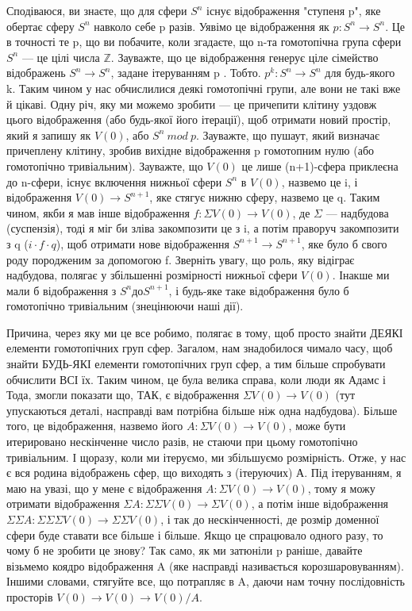 Сподіваюся, ви знаєте, що для сфери $S^n$ існує відображення "ступеня p",
яке обертає сферу $S^n$ навколо себе p разів. Уявімо це відображення як
$p: S^n \rightarrow S^n$. Це в точності те p, що ви побачите, коли згадаєте,
що n-та гомотопічна група сфери $S^n$ --- це цілі числа $\mathbb{Z}$.
Зауважте, що це відображення генерує ціле сімейство відображень $S^n \rightarrow S^n$,
задане ітеруванням p . Тобто. $p^k: S^n \rightarrow S^n$ для будь-якого k.
Таким чином у нас обчислилися деякі гомотопічні групи, але вони не такі вже й цікаві.
Одну річ, яку ми можемо зробити --- це причепити клітину уздовж цього
відображення (або будь-якої його ітерації), щоб отримати новий простір,
який я запишу як $V(0)$, або $S^n\ mod\ p$. Зауважте, що пушаут, який визначає
причеплену клітину, зробив вихідне відображення p гомотопним нулю (або гомотопічно
тривіальним). Зауважте, що $V(0)$ це лише (n+1)-сфера приклеєна до n-сфери,
існує включення нижньої сфери $S^n$ в $V(0)$, назвемо це i, і відображення
$V(0) \rightarrow S^{n+1}$, яке стягує нижню сферу, назвемо це q. Таким чином,
якби я мав інше відображення $f: \Sigma V(0) \rightarrow V(0)$, де $\Sigma$ ---
надбудова (суспензія), тоді я міг би зліва закомпозити це з i, а потім
праворуч закомпозити з q ($i \cdot f \cdot q$), щоб отримати нове
відображення $S^{n+1} \rightarrow S^{n+1}$, яке було б свого роду
породженим за допомогою f. Зверніть увагу, що роль, яку відіграє
надбудова, полягає у збільшенні розмірності нижньої сфери $V(0)$. Інакше ми
мали б відображення з $S^n до S^{n+1}$, і будь-яке таке відображення було б
гомотопічно тривіальним (знецінюючи наші дії).

Причина, через яку ми це все робимо, полягає в тому, щоб просто знайти ДЕЯКІ
елементи гомотопічних груп сфер. Загалом, нам знадобилося чимало часу, щоб
знайти БУДЬ-ЯКІ елементи гомотопічних груп сфер, а тим більше спробувати
обчислити ВСІ їх. Таким чином, це була велика справа, коли люди як Адамс і Тода,
змогли показати що, ТАК, є відображення $\Sigma V(0) \rightarrow V(0)$ (тут упускаються деталі,
насправді вам потрібна більше ніж одна надбудова). Більше того, це відображення,
назвемо його $A: \Sigma V(0) \rightarrow V(0)$, може бути итерировано нескінченне
число разів, не стаючи при цьому гомотопічно тривіальним. І щоразу, коли ми ітеруємо,
ми збільшуємо розмірність. Отже, у нас є вся родина відображень сфер, що
виходять з (ітеруючих) А. Під ітеруванням, я маю на увазі, що у мене є
відображення $A: \Sigma V(0) \rightarrow V(0)$, тому я можу отримати
відображення $\Sigma A: \Sigma\Sigma V(0) \rightarrow \Sigma V(0)$,
а потім інше відображення
$\Sigma\Sigma A: \Sigma\Sigma\Sigma V(0) \rightarrow \Sigma\Sigma V(0)$, і так до нескінченності,
де розмір доменної сфери буде ставати все більше і більше. Якщо це спрацювало
одного разу, то чому б не зробити це знову? Так само, як ми затюніли p раніше,
давайте візьмемо коядро відображення A (яке насправді називається корозшаровуванням).
Іншими словами, стягуйте все, що потрапляє в A, даючи нам точну послідовність
просторів $V(0) \rightarrow V(0) \rightarrow V(0)/A$.

